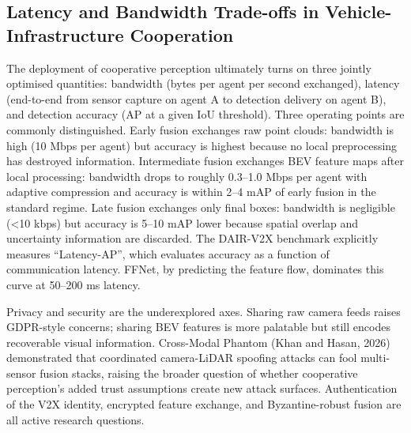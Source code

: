 \documentclass{article}
\begin{document}
\subsection{Latency and Bandwidth Trade-offs in Vehicle-Infrastructure Cooperation}\label{latency-and-bandwidth-trade-offs-in-vehicle-infrastructure-cooperation}

The deployment of cooperative perception ultimately turns on three jointly optimised quantities: bandwidth (bytes per agent per second exchanged), latency (end-to-end from sensor capture on agent A to detection delivery on agent B), and detection accuracy (AP at a given IoU threshold). Three operating points are commonly distinguished. Early fusion exchanges raw point clouds: bandwidth is high (10 Mbps per agent) but accuracy is highest because no local preprocessing has destroyed information. Intermediate fusion exchanges BEV feature maps after local processing: bandwidth drops to roughly 0.3--1.0 Mbps per agent with adaptive compression and accuracy is within 2--4 mAP of early fusion in the standard regime. Late fusion exchanges only final boxes: bandwidth is negligible (\textless10 kbps) but accuracy is 5--10 mAP lower because spatial overlap and uncertainty information are discarded. The DAIR-V2X benchmark explicitly measures ``Latency-AP'', which evaluates accuracy as a function of communication latency. FFNet, by predicting the feature flow, dominates this curve at 50--200 ms latency.

Privacy and security are the underexplored axes. Sharing raw camera feeds raises GDPR-style concerns; sharing BEV features is more palatable but still encodes recoverable visual information. Cross-Modal Phantom (Khan and Hasan, 2026) demonstrated that coordinated camera-LiDAR spoofing attacks can fool multi-sensor fusion stacks, raising the broader question of whether cooperative perception's added trust assumptions create new attack surfaces. Authentication of the V2X identity, encrypted feature exchange, and Byzantine-robust fusion are all active research questions.
\end{document}
